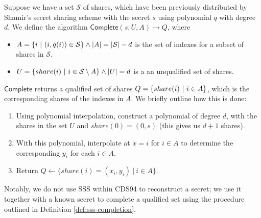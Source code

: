 \begin{definition}\label{def:sss-completion}
Suppose we have a set $\mathcal S$ of shares, which have been previously distributed by 
Shamir's secret sharing scheme with the secret $s$ using polynomial $q$ with degree $d$. 
We define the algorithm $\textsf{Complete}(s, U, A) \rightarrow Q$, where
\begin{itemize}
    \item $A = \{i \ \vert\  (i, q(i)) \in \mathcal S\} \land |A| = |\mathcal S| - d$ is the set of indexes for 
    a subset of shares in $\mathcal S$.
    \item $U = \{ share(i) \ \vert\  i \in \mathcal S \setminus A\} \land |U| = d$ is a 
    an unqualified set of shares.  
\end{itemize}

$\textsf{Complete}$ returns a qualified set of shares $Q = \{share(i) \ \vert\  i \in A\}$, which is 
the corresponding shares of the indexes in $A$. We briefly outline how this is done:

\begin{enumerate}
    \item Using polynomial interpolation, construct a polynomial of degree $d$, 
    with the shares in the set $U$ and $share(0) = (0, s)$ (this gives us $d + 1$ shares). 
    \item With this polynomial, interpolate at $x = i$ for $i \in A$ to determine the 
    corresponding $y_i$ for each $i \in A$.
    \item Return $Q \leftarrow \{share(i) =  (x_i, y_i)\ |\ i \in A\}$.
\end{enumerate}
    
\end{definition}

Notably, we do not use SSS within CDS94 to reconstruct a secret; we use it together with a known secret to complete a qualified set using the procedure outlined in Definition \ref{def:sss-completion}.

